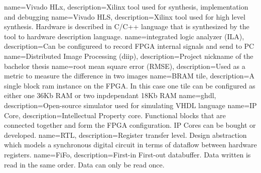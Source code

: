 %
%
{
    name=Vivado HLx,
    description={Xilinx tool used for synthesis, implementation and debugging}
}
{
    name=Vivado HLS,
    description={Xilinx tool used for high level synthesis. Hardware is
    described in C/C++ language that is synthesized by the tool to hardware
    description language.}
}
{
    name=integrated logic analyzer (ILA),
    description={Can be configureed to record FPGA internal signals and send to PC}
}
{
    name=Distributed Image Processing (diip),
    description={Project nickname of the bachelor thesis}
}
{
    name=root mean square error (RMSE),
    description={Used as a metric to measure the difference in two images}
}
{
    name=BRAM tile,
    description={A single block ram instance on the FPGA. In this case one tile
    can be configured as either one 36Kb RAM or two inpdependant 18Kb RAM}
}
{
    name=ghdl,
    description={Open-source simulator used for simulating VHDL language}
}
{
    name=IP Core,
    description={Intellectual Property core. Functional blocks that are
    connected together and form the FPGA configuration. IP Cores can be bought
    or developed.}
}
{
    name=RTL,
    description={Register transfer level. Design abstraction which models a
    synchronous digital circuit in terms of dataflow between hardware
    registers.}
}
{
    name=FiFo,
    description={First-in First-out databuffer. Data written is read in the
    same order. Data can only be read once.}
}